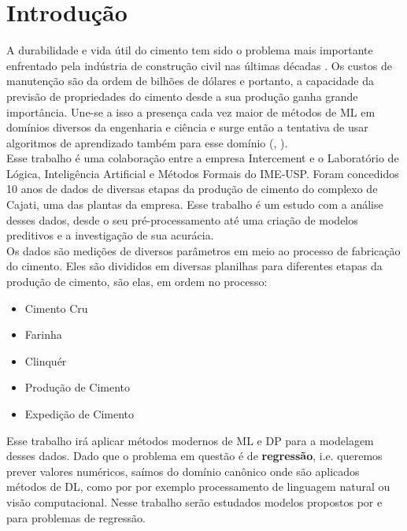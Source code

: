 \chapter{Introdução}
\label{cap:introducao}


A durabilidade e vida útil do cimento tem sido o problema mais importante enfrentado pela indústria de construção civil nas últimas décadas \citep{cementml}. Os custos de manutenção são da ordem de bilhões de dólares e portanto, a capacidade da previsão de propriedades do cimento desde a sua produção ganha grande importância. Une-se a isso a presença cada vez maior de métodos de ML em domínios diversos da engenharia e ciência e surge então a tentativa de usar algoritmos de aprendizado também para esse domínio (\cite{cementnn1}, \cite{cementnn2}). \\ 

Esse trabalho é uma colaboração entre a empresa Intercement e o Laboratório de
Lógica, Inteligência Artificial e Métodos Formais do IME-USP. Foram concedidos
10 anos de dados de diversas etapas da produção de cimento do complexo de
Cajati, uma das plantas da empresa. Esse trabalho é um estudo com a análise
desses dados, desde o seu pré-processamento até uma criação de modelos
preditivos e a investigação de sua acurácia. \\


Os dados são medições de diversos parâmetros em meio ao processo de fabricação do cimento. Eles são divididos em diversas planilhas para diferentes etapas da produção de cimento, são elas, em ordem no processo:

\begin{itemize}
        \item Cimento Cru
        \item Farinha
        \item Clinquér
        \item Produção de Cimento
        \item Expedição de Cimento
\end{itemize}


Esse trabalho irá aplicar métodos modernos de ML e DP para a modelagem desses
dados. Dado que o problema em questão é de \textbf{regressão}, i.e. queremos
prever valores numéricos, saímos do domínio canônico onde são aplicados métodos
de DL, como por por exemplo processamento de linguagem natural ou visão computacional. Nesse trabalho serão estudados modelos propostos por \citet{ubertime} e \citet{energylstm} para problemas de regressão.


